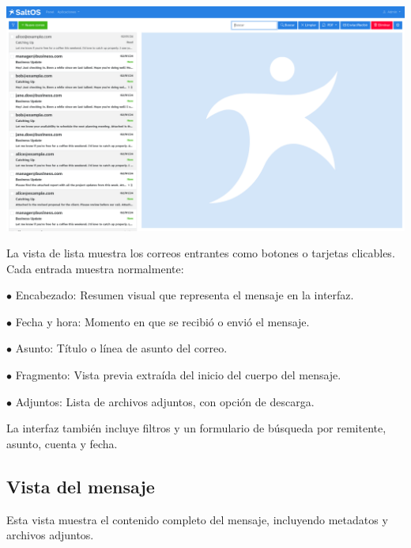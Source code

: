 \documentclass[a4paper]{article}
\begin{document}
\begin{center}\includegraphics[width=1\textwidth]{../ujest/snaps/test-screenshots-js-screenshots-emails-emails-list-es-es-1-snap.png}\end{center}

La vista de lista muestra los correos entrantes como botones o tarjetas clicables.
Cada entrada muestra normalmente:

\begin{compactitem}
\item[\color{myblue}$\bullet$] Encabezado: Resumen visual que representa el mensaje en la interfaz.
\item[\color{myblue}$\bullet$] Fecha y hora: Momento en que se recibió o envió el mensaje.
\item[\color{myblue}$\bullet$] Asunto: Título o línea de asunto del correo.
\item[\color{myblue}$\bullet$] Fragmento: Vista previa extraída del inicio del cuerpo del mensaje.
\item[\color{myblue}$\bullet$] Adjuntos: Lista de archivos adjuntos, con opción de descarga.
\end{compactitem}

La interfaz también incluye filtros y un formulario de búsqueda por remitente, asunto, cuenta y fecha.

\hypertarget{toc93}{}
\subsection{Vista del mensaje}

Esta vista muestra el contenido completo del mensaje, incluyendo metadatos y archivos adjuntos.
\end{document}
